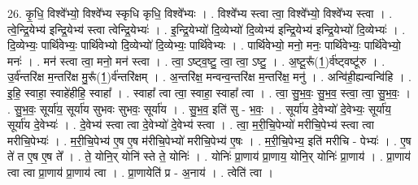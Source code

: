 \documentclass[17pt]{extarticle}
\begin{document}
26. कृ॒धि॒ विश्वे᳚भ्यो॒ विश्वे᳚भ्य स्कृधि कृधि॒ विश्वे᳚भ्यः । . विश्वे᳚भ्य स्त्वा त्वा॒ विश्वे᳚भ्यो॒ विश्वे᳚भ्य स्त्वा । . त्वे॒न्द्रि॒येभ्य॑ इन्द्रि॒येभ्य॑ स्त्वा त्वेन्द्रि॒येभ्यः॑ । . इ॒न्द्रि॒येभ्यो॑ दि॒व्येभ्यो॑ दि॒व्येभ्य॑ इन्द्रि॒येभ्य॑ इन्द्रि॒येभ्यो॑ दि॒व्येभ्यः॑ । . दि॒व्येभ्यः॒ पार्थि॑वेभ्यः॒ पार्थि॑वेभ्यो दि॒व्येभ्यो॑ दि॒व्येभ्यः॒ पार्थि॑वेभ्यः । . पार्थि॑वेभ्यो॒ मनो॒ मनः॒ पार्थि॑वेभ्यः॒ पार्थि॑वेभ्यो॒ मनः॑ । . मन॑ स्त्वा त्वा॒ मनो॒ मन॑ स्त्वा । . त्वा॒ ऽष्ट्व॒ष्टु॒ त्वा॒ त्वा॒ ऽष्टु॒ । . अ॒ष्टू॒रू᳚(1॒)र्व॑ष्ट्वष्टू॑रु । . उ॒र्व॑न्तरि॑क्ष म॒न्तरि॑क्ष मु॒रू᳚(1॒)र्व॑न्तरि॑क्षम् । . अ॒न्तरि॑क्ष॒ मन्वन्व॒न्तरि॑क्ष म॒न्तरि॑क्ष॒ मनु॑ । . अन्वि॑ही॒ह्यन्वन्वि॑हि । . इ॒हि॒ स्वाहा॒ स्वाहे॑हीहि॒ स्वाहा᳚ । . स्वाहा᳚ त्वा त्वा॒ स्वाहा॒ स्वाहा᳚ त्वा । . त्वा॒ सु॒भ॒वः॒ सु॒भ॒व॒ स्त्वा॒ त्वा॒ सु॒भ॒वः॒ । . सु॒भ॒वः॒ सूर्या॑य॒ सूर्या॑य सुभवः सुभवः॒ सूर्या॑य । . सु॒भ॒व॒ इति॑ सु - भ॒वः॒ । . सूर्या॑य दे॒वेभ्यो॑ दे॒वेभ्यः॒ सूर्या॑य॒ सूर्या॑य दे॒वेभ्यः॑ । . दे॒वेभ्य॑ स्त्वा त्वा दे॒वेभ्यो॑ दे॒वेभ्य॑ स्त्वा । . त्वा॒ म॒री॒चि॒पेभ्यो॑ मरीचि॒पेभ्य॑ स्त्वा त्वा मरीचि॒पेभ्यः॑ । . म॒री॒चि॒पेभ्य॑ ए॒ष ए॒ष म॑रीचि॒पेभ्यो॑ मरीचि॒पेभ्य॑ ए॒षः । . म॒री॒चि॒पेभ्य॒ इति॑ मरीचि - पेभ्यः॑ । . ए॒ष ते॑ त ए॒ष ए॒ष ते᳚ । . ते॒ योनि॒र् योनि॑ स्ते ते॒ योनिः॑ । . योनिः॑ प्रा॒णाय॑ प्रा॒णाय॒ योनि॒र् योनिः॑ प्रा॒णाय॑ । . प्रा॒णाय॑ त्वा त्वा प्रा॒णाय॑ प्रा॒णाय॑ त्वा । . प्रा॒णायेति॑ प्र - अ॒नाय॑ । . त्वेति॑ त्वा । \newline
\end{document}
